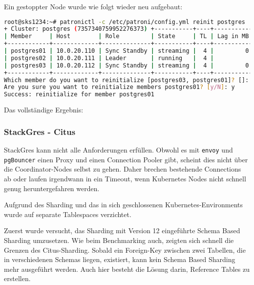 \begin{flushleft}
\begin{lstlisting}[language=bash, caption=Patroni - Testing - Switchover,captionpos=b,label={lst:testing_patroni_switchover},breaklines=true]
\end{lstlisting}
    Ein gestoppter Node wurde wie folgt wieder neu aufgebaut:
\lstset{style=gra_codestyle}
\begin{lstlisting}[language=bash, caption=Patroni - Testing - Reinit,captionpos=b,label={lst:testing_patroni_reinit},breaklines=true]
root@sks1234:~# patronictl -c /etc/patroni/config.yml reinit postgres
+ Cluster: postgres (7357340759952276373) +-----------+----+-----------+
| Member     | Host        | Role         | State     | TL | Lag in MB |
+------------+-------------+--------------+-----------+----+-----------+
| postgres01 | 10.0.20.110 | Sync Standby | streaming |  4 |         0 |
| postgres02 | 10.0.20.111 | Leader       | running   |  4 |           |
| postgres03 | 10.0.20.112 | Sync Standby | streaming |  4 |         0 |
+------------+-------------+--------------+-----------+----+-----------+
Which member do you want to reinitialize [postgres03, postgres01]? []: postgres01
Are you sure you want to reinitialize members postgres01? [y/N]: y
Success: reinitialize for member postgres01
\end{lstlisting}
\end{flushleft}
\clearpage
{}
\recalctypearea
\begin{flushleft}
    Das vollständige Ergebnis:
    
\end{flushleft}
\clearpage
{}
\recalctypearea
\begin{flushleft}
    \subsubsection{StackGres - Citus}
    StackGres kann nicht alle Anforderungen erfüllen.
    Obwohl es mit \texttt{envoy} und \texttt{pgBouncer} einen Proxy und einen \Gls{Connection Pooler} gibt,
    scheint dies nicht über die Coordinator-Nodes selbst zu gehen.
    Daher brechen bestehende Connections ab oder laufen irgendwann in ein Timeout, wenn \Gls{Kubernetes} Nodes nicht schnell genug heruntergefahren werden.
\end{flushleft}
\begin{flushleft}
    Aufgrund des Sharding und das in sich geschlossenen \Gls{Kubernetes}-Environments wurde auf separate Tablespaces verzichtet.
\end{flushleft}
\begin{flushleft}
    Zuerst wurde versucht, das Sharding mit Version 12 eingeführte Schema Based Sharding umzusetzen.
    Wie beim Benchmarking auch, zeigten sich schnell die Grenzen des Citus-Sharding.
    Sobald ein Foreign-Key zwischen zwei Tabellen, die in verschiedenen Schemas liegen, existiert, kann kein Schema Based Sharding mehr ausgeführt werden.
    Auch hier besteht die Lösung darin, Reference Tables zu erstellen.
\end{flushleft}
